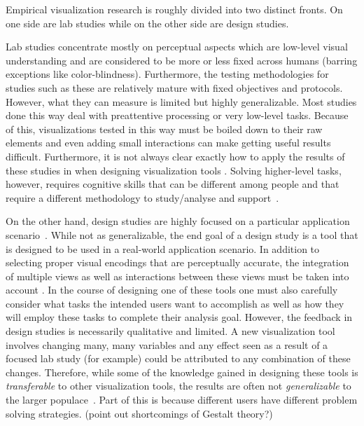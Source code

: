 
Empirical visualization research is roughly divided into two distinct fronts.
On one side are lab studies while on the other side are design studies.

Lab studies concentrate mostly on perceptual aspects which are low-level visual
understanding and are considered to be more or less fixed across humans
(barring exceptions like color-blindness). Furthermore, the testing
methodologies for studies such as these are relatively mature with fixed
objectives and protocols. However, what they can measure is limited but highly
generalizable. Most studies done this way deal with preattentive processing
 or
very low-level tasks. Because of this, visualizations tested in this way must be
boiled down to their raw elements and even adding small interactions can make
getting useful results difficult.  Furthermore, it is not always clear exactly
how to apply the results of these studies in when designing visualization
tools  . 
Solving higher-level tasks, however, requires cognitive 
skills that can be different among people and that require a different 
methodology to study/analyse and support~.

On the other hand, design studies are highly focused on a particular
application scenario~. While not as generalizable, the end goal of a design
study is a tool that is designed to be used in a real-world application
scenario. In addition to selecting proper visual encodings that are
perceptually accurate, the integration of multiple views as well as
interactions between these views must be taken into account
. In the course of
designing one of these tools one must also carefully consider what tasks the
intended users want to accomplish as well as how they will employ these tasks
to complete their analysis goal. However, the feedback in design studies is
necessarily qualitative and limited. A new visualization tool involves changing
many, many variables and any effect seen as a result of a focused lab study
(for example) could be attributed to any combination of these changes.
Therefore, while some of the knowledge gained in designing these tools is
\emph{transferable} to other visualization tools, the results are often not
\emph{generalizable} to the larger populace~.  
Part of this is because different
users have different problem solving strategies. (point out shortcomings of
Gestalt theory?)

